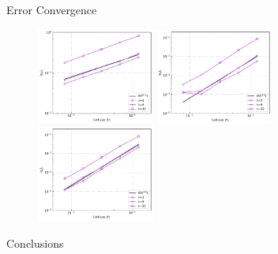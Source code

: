 \documentclass[10pt,aspectratio=169]{beamer}
\begin{document}
\begin{frame}[fragile]{Error Convergence}
\begin{figure}
		\begin{multicols}{3}
			\includegraphics[width=3.85cm]{../Annulus_Benchmark_Kramer/benchmark_figs/case3_k_0_p_err_conv_vel_penalty_2.5e+08_stokes_tol_1.0e-10.pdf}\par
			\hspace{-0.08in} 
			\includegraphics[width=3.85cm]{../Annulus_Benchmark_Kramer/benchmark_figs/case4_k_2_p_err_conv_vel_penalty_2.5e+08_stokes_tol_1.0e-10.pdf}\par
			\hspace{-0.12in}
			\includegraphics[width=3.85cm]{../Annulus_Benchmark_Kramer/benchmark_figs/case4_k_8_p_err_conv_vel_penalty_2.5e+08_stokes_tol_1.0e-10.pdf}
		\end{multicols}
	\end{figure}
\end{frame}

\begin{frame}[fragile]{Conclusions}
\end{frame}
\end{document}
